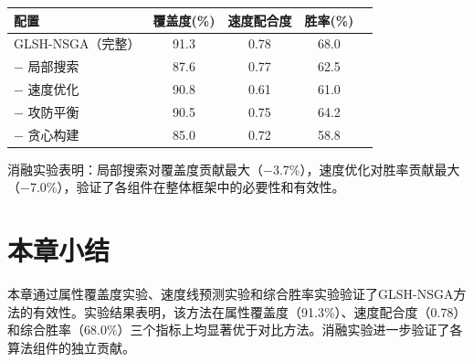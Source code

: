 \begin{table}[!htbp]
    \label{tab:ablation}
    \centering
    \footnotesize
    \begin{tabular}{lcccc}
        \hline
        配置 & 覆盖度(\%) & 速度配合度 & 胜率(\%) \\
        \hline
        GLSH-NSGA（完整） & 91.3 & 0.78 & 68.0 \\
        $-$ 局部搜索 & 87.6 & 0.77 & 62.5 \\
        $-$ 速度优化 & 90.8 & 0.61 & 61.0 \\
        $-$ 攻防平衡 & 90.5 & 0.75 & 64.2 \\
        $-$ 贪心构建 & 85.0 & 0.72 & 58.8 \\
        \hline
    \end{tabular}
\end{table}

消融实验表明：局部搜索对覆盖度贡献最大（$-$3.7\%），速度优化对胜率贡献最大（$-$7.0\%），验证了各组件在整体框架中的必要性和有效性。

\section{本章小结}

本章通过属性覆盖度实验、速度线预测实验和综合胜率实验验证了GLSH-NSGA方法的有效性。实验结果表明，该方法在属性覆盖度（91.3\%）、速度配合度（0.78）和综合胜率（68.0\%）三个指标上均显著优于对比方法。消融实验进一步验证了各算法组件的独立贡献。
